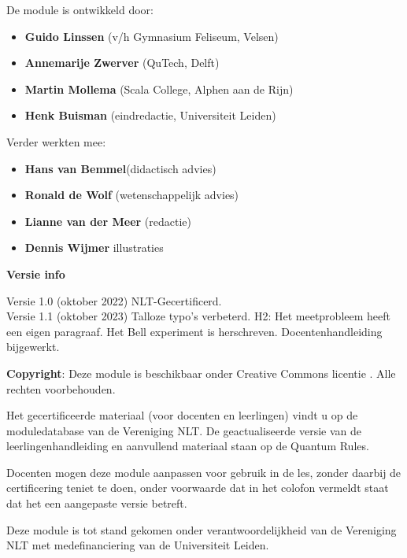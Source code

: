 \documentclass[../../main.tex]{subfiles}
\begin{document}
De module is ontwikkeld door:
\begin{itemize}[nosep]
\item \textbf{Guido Linssen} (v/h Gymnasium Feliseum, Velsen)
\item \textbf{Annemarije Zwerver} (QuTech, Delft)
\item \textbf{Martin Mollema} (Scala College, Alphen aan de Rijn)
\item \textbf{Henk Buisman} (eindredactie, Universiteit Leiden)
\end{itemize}
Verder werkten mee:
\begin{itemize}[nosep]
\item \textbf{Hans van Bemmel}(didactisch advies)
\item \textbf{Ronald de Wolf} (wetenschappelijk advies)
\item \textbf{Lianne van der Meer} (redactie)
\item \textbf{Dennis Wijmer} illustraties
\end{itemize}

\textbf{Versie info}

Versie 1.0 (oktober 2022) NLT-Gecertificerd.\\
Versie 1.1 (oktober 2023) Talloze typo's verbeterd. H2: Het meetprobleem heeft een eigen paragraaf. Het Bell experiment is herschreven. Docentenhandleiding bijgewerkt.

\textbf{Copyright}: Deze module is beschikbaar onder Creative Commons licentie . Alle rechten voorbehouden.

Het gecertificeerde materiaal (voor docenten en leerlingen) vindt u op  de moduledatabase van de Vereniging NLT.
De geactualiseerde versie van de leerlingenhandleiding en aanvullend materiaal staan op de  Quantum Rules. 

Docenten mogen deze module aanpassen voor gebruik in de les, zonder daarbij de certificering teniet te doen, onder voorwaarde dat in het colofon vermeldt staat dat het een aangepaste versie betreft.

Deze module is tot stand gekomen onder verantwoordelijkheid van de Vereniging NLT met medefinanciering van de Universiteit Leiden.
\end{document}
